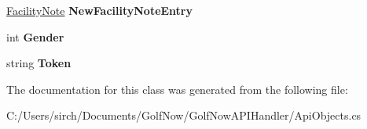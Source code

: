 \begin{DoxyCompactItemize}
\mbox{\hyperlink{class_golf_now_a_p_i_1_1_facility_note}{Facility\+Note}} {\bfseries New\+Facility\+Note\+Entry}
\item 
\mbox{\label{class_golf_now_a_p_i_1_1_customer_profile_a6d4ab1e57084ebc0d0d0bf119d030675}} 
int {\bfseries Gender}
\item 
\mbox{\label{class_golf_now_a_p_i_1_1_customer_profile_ad34a56e25bee13c0bcd3a89d244097e8}} 
string {\bfseries Token}
\end{DoxyCompactItemize}


The documentation for this class was generated from the following file\+:\begin{DoxyCompactItemize}
\item 
C\+:/\+Users/sirch/\+Documents/\+Golf\+Now/\+Golf\+Now\+A\+P\+I\+Handler/Api\+Objects.\+cs\end{DoxyCompactItemize}
